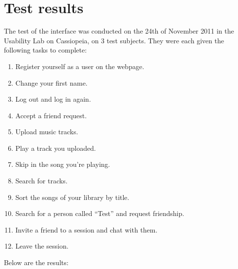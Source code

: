 \section{Test results}

The test of the interface was conducted on the 24th of November 2011 in the Usability Lab on Cassiopeia, on 3 test subjects.
They were each given the following tasks to complete:
\begin{enumerate}
	\item Register yourself as a user on the webpage.
	\item Change your first name.
	\item Log out and log in again.
	\item Accept a friend request.
	\item Upload music tracks.
	\item Play a track you uploaded.
	\item Skip in the song you're playing.
	\item Search for tracks.
	\item Sort the songs of your library by title.
	\item Search for a person called ``Test'' and request friendship.
	\item Invite a friend to a session and chat with them. 
	\item Leave the session.
\end{enumerate}

Below are the results:



